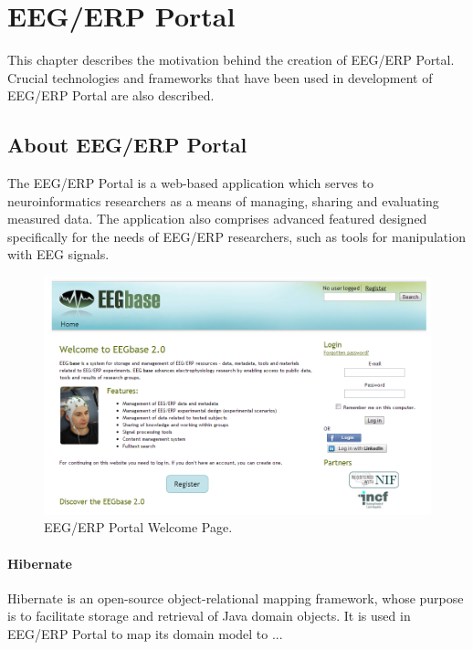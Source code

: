 \chapter{EEG/ERP Portal}

This chapter describes the motivation behind the creation of EEG/ERP Portal. Crucial technologies and frameworks that have been used in development of EEG/ERP Portal are also described.

\section{About EEG/ERP Portal}

The EEG/ERP Portal is a web-based application which serves to neuroinformatics researchers as a means of managing, sharing and evaluating measured data. The application also comprises advanced featured designed specifically for the needs of EEG/ERP researchers, such as tools for manipulation with EEG signals.


\begin{figure}
	\centering
		\includegraphics[width=1.00\textwidth]{figures/eegPortal.png}
	\caption{EEG/ERP Portal Welcome Page.}
	\label{fig:eegPortal}
\end{figure}


\subsubsection*{Hibernate}

Hibernate \cite{Hibernate:Home} is an open-source object-relational mapping framework, whose purpose is to facilitate storage and retrieval of Java domain objects. It is used in EEG/ERP Portal to map its domain model to ...

